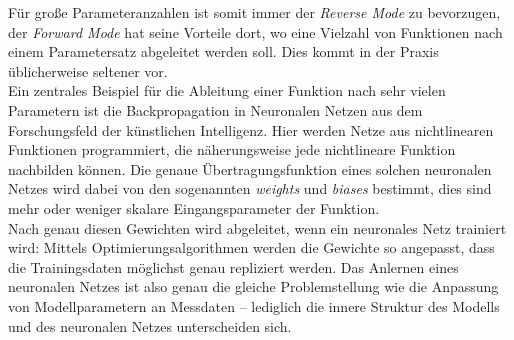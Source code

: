 \documentclass{scrartcl}
\begin{document}
Für große Parameteranzahlen ist somit immer der \emph{Reverse Mode} zu bevorzugen, der \emph{Forward Mode} hat seine Vorteile dort, wo eine Vielzahl von Funktionen nach einem Parametersatz abgeleitet werden soll. Dies kommt in der Praxis üblicherweise seltener vor.\\
Ein zentrales Beispiel für die Ableitung einer Funktion nach sehr vielen Parametern ist die Backpropagation in Neuronalen Netzen aus dem Forschungsfeld der künstlichen Intelligenz. Hier werden Netze aus nichtlinearen Funktionen programmiert, die näherungsweise jede nichtlineare Funktion nachbilden können. Die genaue Übertragungsfunktion eines solchen neuronalen Netzes wird dabei von den sogenannten \emph{weights} und \emph{biases} bestimmt, dies sind mehr oder weniger skalare Eingangsparameter der Funktion.\\
Nach genau diesen Gewichten wird abgeleitet, wenn ein neuronales Netz trainiert wird: Mittels Optimierungsalgorithmen werden die Gewichte so angepasst, dass die Trainingsdaten möglichst genau repliziert werden. Das Anlernen eines neuronalen Netzes ist also genau die gleiche Problemstellung  wie die Anpassung von Modellparametern an Messdaten -- lediglich die innere Struktur des Modells und des neuronalen Netzes unterscheiden sich.\\
\end{document}
